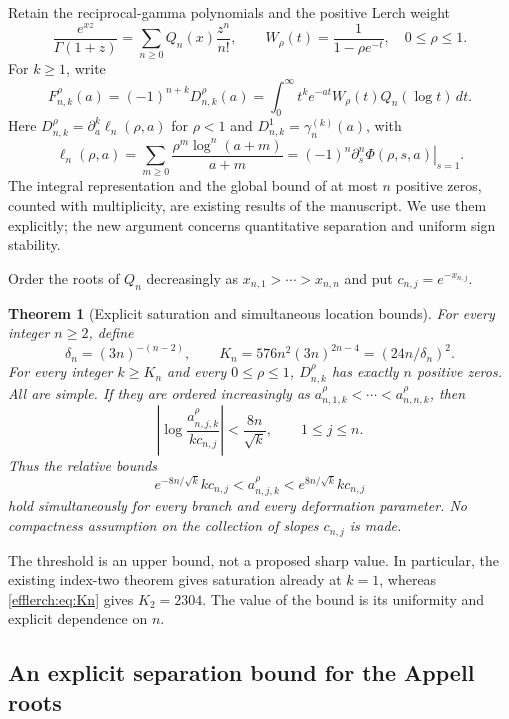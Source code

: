 \documentclass[11pt,letterpaper]{article}
\newtheorem{theorem}{Theorem}[section]
\theoremstyle{definition}
\theoremstyle{remark}
\begin{document}
Retain the reciprocal-gamma polynomials and the positive Lerch weight
\[
 \frac{e^{xz}}{\Gamma(1+z)}
   =\sum_{n\geq0}Q_n(x)\frac{z^n}{n!},
 \qquad W_\rho(t)=\frac1{1-\rho e^{-t}},\quad 0\leq\rho\leq1.
\]
For $k\geq1$, write
\begin{equation}\label{efflerch:eq:F}
 F_{n,k}^\rho(a)=(-1)^{n+k}D_{n,k}^\rho(a)
 =\int_0^\infty t^k e^{-at}W_\rho(t)Q_n(\log t)\,dt.
\end{equation}
Here $D_{n,k}^\rho=\partial_a^k\ell_n(\rho,a)$ for $\rho<1$
and $D_{n,k}^1=\gamma_n^{(k)}(a)$, with
\[
 \ell_n(\rho,a)=\sum_{m\geq0}
       \frac{\rho^m\log^n(a+m)}{a+m}
 =(-1)^n\left.\partial_s^n\Phi(\rho,s,a)\right|_{s=1}.
\]
The integral representation and the
global bound of at most $n$ positive zeros, counted with multiplicity,
are existing results of the manuscript.  We use them explicitly;
the new argument concerns quantitative separation and uniform sign
stability.

Order the roots of $Q_n$ decreasingly as
$x_{n,1}>\cdots>x_{n,n}$ and put $c_{n,j}=e^{-x_{n,j}}$.

\begin{theorem}[Explicit saturation and simultaneous location bounds]
\label{efflerch:thm:explicit}
For every integer $n\geq2$, define
\begin{equation}\label{efflerch:eq:Kn}
 \delta_n=(3n)^{-(n-2)},\qquad
 K_n=576n^2(3n)^{2n-4}=(24n/\delta_n)^2.
\end{equation}
For every integer $k\geq K_n$ and every $0\leq\rho\leq1$,
$D_{n,k}^\rho$ has exactly $n$ positive zeros.  All are simple.
If they are ordered increasingly as $a_{n,1,k}^\rho<\cdots<a_{n,n,k}^\rho$,
then
\begin{equation}\label{efflerch:eq:location}
 \left|\log\frac{a_{n,j,k}^\rho}{k c_{n,j}}\right|
   <\frac{8n}{\sqrt{k}},\qquad 1\leq j\leq n.
\end{equation}
Thus the relative bounds
\[
 e^{-8n/\sqrt{k}}k c_{n,j}
  <a_{n,j,k}^\rho<e^{8n/\sqrt{k}}k c_{n,j}
\]
hold simultaneously for every branch and every deformation parameter.
No compactness assumption on the collection of slopes $c_{n,j}$ is made.
\end{theorem}

The threshold is an upper bound, not a proposed sharp value.  In particular,
the existing index-two theorem gives saturation already at $k=1$, whereas
\eqref{efflerch:eq:Kn} gives $K_2=2304$.  The value of the bound is its
uniformity and explicit dependence on $n$.

\subsection{An explicit separation bound for the Appell roots}
\end{document}
